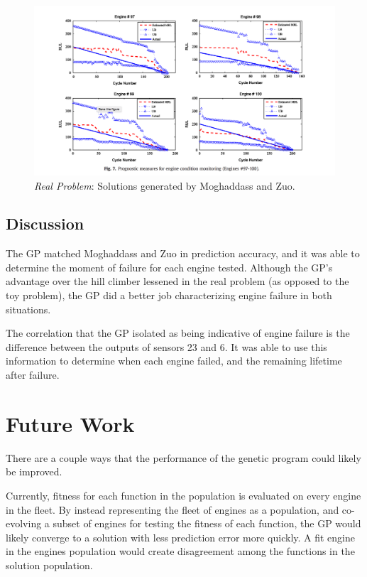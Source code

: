 \documentclass{acm_proc_article-sp}
\begin{document}
\begin{figure}
\centering
\includegraphics[scale=0.45]{benchmark.png}
\caption{{\it{Real Problem}}: Solutions generated by Moghaddass and Zuo. \cite{Mog}}
\end{figure}


\subsection{Discussion}
The GP matched Moghaddass and Zuo in prediction accuracy, and it was able to determine the moment of failure for each engine tested. Although the GP's advantage over the hill climber lessened in the real problem (as opposed to the toy problem), the GP did a better job characterizing engine failure in both situations.

The correlation that the GP isolated as being indicative of engine failure is the difference between the outputs of sensors 23 and 6. It was able to use this information to determine when each engine failed, and the remaining lifetime after failure.

\section{Future Work}
There are a couple ways that the performance of the genetic program could likely be improved. 

Currently, fitness for each function in the population is evaluated on every engine in the fleet. By instead representing the fleet of engines as a population, and co-evolving a subset of engines for testing the fitness of each function, the GP would likely converge to a solution with less prediction error more quickly. A fit engine in the engines population would create disagreement among the functions in the solution population.
\end{document}
